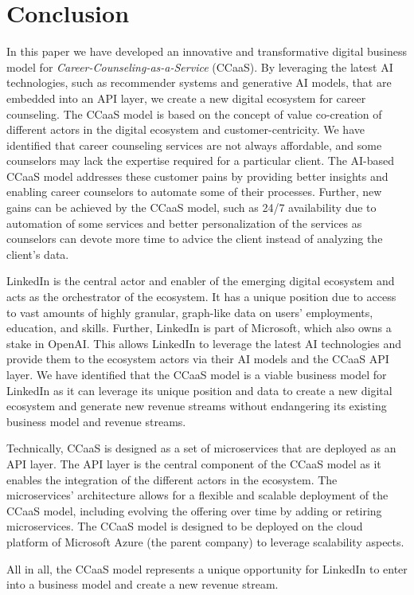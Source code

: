 \section{Conclusion}
\label{sec:conclusion}

In this paper we have developed an innovative and transformative digital business model
for \textit{Career-Counseling-as-a-Service} (CCaaS). By leveraging the latest AI technologies,
such as recommender systems and generative AI models, that are embedded into an API layer,
we create a new digital ecosystem for career counseling. The CCaaS model is based on the
concept of value co-creation of different actors in the digital ecosystem and customer-centricity.
We have identified that career counseling services are not always affordable, and some counselors 
may lack the expertise required for a particular client. The AI-based CCaaS model addresses
these customer pains by providing better insights and enabling career counselors to automate
some of their processes. Further, new gains can be achieved by the CCaaS model, such as
24/7 availability due to automation of some services and better personalization of the
services as counselors can devote more time to advice the client instead of analyzing
the client's data.

LinkedIn is the central actor and enabler of the emerging digital ecosystem and acts as
the orchestrator of the ecosystem. It has a unique position due to access to vast amounts 
of highly granular, graph-like data on users' employments, education, and skills. Further,
LinkedIn is part of Microsoft, which also owns a stake in OpenAI. This allows LinkedIn
to leverage the latest AI technologies and provide them to the ecosystem actors via
their AI models and the CCaaS API layer. We have identified that the CCaaS model
is a viable business model for LinkedIn as it can leverage its unique position and
data to create a new digital ecosystem and generate new revenue streams without
endangering its existing business model and revenue streams.

Technically, CCaaS is designed as a set of microservices that are deployed as an 
API layer. The API layer is the central component of the CCaaS model as it enables
the integration of the different actors in the ecosystem. The microservices' architecture
allows for a flexible and scalable deployment of the CCaaS model, including evolving
the offering over time by adding or retiring microservices. The CCaaS model is
designed to be deployed on the cloud platform of Microsoft Azure (the parent company)
to leverage scalability aspects.

All in all, the CCaaS model represents a unique opportunity for LinkedIn to
enter into a business model and create a new revenue stream.
